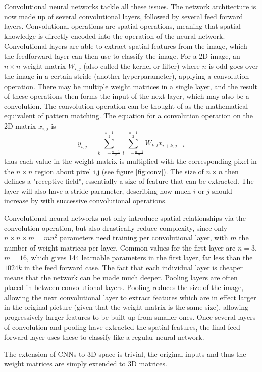 Convolutional neural networks tackle all these issues. The network architecture is now made up of several convolutional layers, followed by several feed forward layers. Convolutional operations are  spatial operations, meaning that spatial knowledge is directly encoded into the operation of the neural network. Convolutional layers are able to extract spatial features from the image, which the feedforward layer can then use to classify the image. For a 2D image, an $n \times n$ weight matrix $W_{i,j}$ (also called the kernel or filter) where $n$ is odd goes over the image in a certain stride (another hyperparameter), applying a convolution operation. There may be multiple weight matrices in a single layer, and the result of these operations then forms the input of the next layer, which may also be a convolution. The convolution operation can be thought of as the mathematical equivalent of pattern matching. The equation for a convolution operation on  the 2D matrix $x_{i,j}$ is
\begin{equation}
y_{i,j} = \sum^{\frac{n-1}{2}}_{k=-\frac{n-1}{2}} \sum^{\frac{n-1}{2}}_{l=-\frac{n-1}{2}} W_{k,l} x_{i+k,j+l} 
\end{equation}
thus each value in the weight matrix is multiplied with the corresponding pixel in the $n \times n$ region about pixel i,j (see figure \ref{fig:conv}). The size of $n \times n$ then defines a "receptive field", essentially a size of feature that can be extracted. The layer will also have a stride parameter, describing how much $i$ or $j$ should increase by with successive convolutional operations. 


Convolutional neural networks not only introduce spatial relationships via the convolution operation, but also drastically reduce complexity, since only $n \times n \times m = mn^2$ parameters need training per convolutional layer, with $m$ the number of weight matrices per layer. Common values for the first layer are $n=3$, $m=16$, which gives 144 learnable parameters in the first layer, far less than the $1024k$ in the feed forward case. The fact that each individual layer is cheaper means that the network can be made much deeper. Pooling layers are often placed in between convolutional layers. Pooling reduces the size of the image, allowing the next convolutional layer to extract features which are in effect larger in the original picture (given that the weight matrix is the same size), allowing progressively larger features to be built up from smaller ones. Once several layers of convolution and pooling have extracted the spatial features, the final feed forward layer uses these to classify like a regular neural network.  

The extension of CNNs to 3D space is trivial, the original inputs and thus the weight matrices are simply extended to 3D matrices.